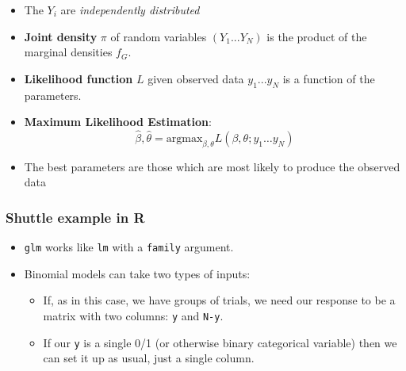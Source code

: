 \documentclass[
  openany]{book}
\newenvironment{Shaded}{\begin{snugshade}}{\end{snugshade}}
\newcommand{\AttributeTok}[1]{\textcolor[rgb]{0.77,0.63,0.00}{#1}}
\newcommand{\FunctionTok}[1]{\textcolor[rgb]{0.00,0.00,0.00}{#1}}
\newcommand{\NormalTok}[1]{#1}
\newcommand{\OtherTok}[1]{\textcolor[rgb]{0.56,0.35,0.01}{#1}}
\newcommand{\SpecialCharTok}[1]{\textcolor[rgb]{0.00,0.00,0.00}{#1}}
\newcommand{\StringTok}[1]{\textcolor[rgb]{0.31,0.60,0.02}{#1}}
\providecommand{\tightlist}{%
  \setlength{\itemsep}{0pt}\setlength{\parskip}{0pt}}
\begin{document}
\begin{itemize}
\tightlist
\item
  The \(Y_i\) are \emph{independently distributed}
\item
  \textbf{Joint density} \(\pi\) of random variables \((Y_1 ...Y_N)\) is the
  product of the marginal densities \(f_G\).
\item
  \textbf{Likelihood function} \(L\) given observed data \(y_1 ... y_N\) is a
  function of the parameters.
\item
  \textbf{Maximum Likelihood Estimation}: \[
  \hat\beta, \hat\theta = \text{argmax}_{\beta,\theta}L(\beta, \theta ; y_1 \ldots y_N)
  \]
\item
  The best parameters are those which are most likely to produce the
  observed data
\end{itemize}

\hypertarget{shuttle-example-in-r}{%
\subsubsection{Shuttle example in R}\label{shuttle-example-in-r}}

\begin{itemize}
\item
  \texttt{glm} works like \texttt{lm} with a \texttt{family} argument.
\item
  Binomial models can take two types of inputs:

  \begin{itemize}
  \tightlist
  \item
    If, as in this case, we have groups of trials, we need our
    response to be a matrix with two columns: \texttt{y} and \texttt{N-y}.
  \item
    If our \texttt{y} is a single 0/1 (or otherwise binary categorical
    variable) then we can set it up as usual, just a single column.
  \end{itemize}
\end{itemize}

\begin{Shaded}
\end{Shaded}
\end{document}
